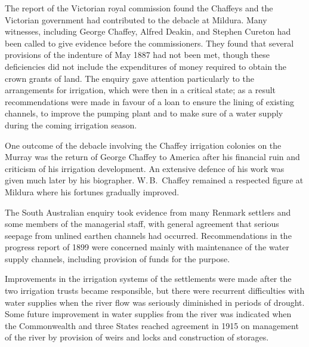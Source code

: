 The report of the Victorian royal commission  found the Chaffeys and the Victorian
government had contributed to the debacle at Mildura.  Many witnesses,
including George Chaffey, Alfred Deakin, and Stephen Cureton had been
called to give evidence before the commissioners.  They found that
several provisions of the indenture of May 1887 had not been met,
though these deficiencies did not include the expenditures of money
required to obtain the crown grants of land.  The enquiry gave
attention particularly to the arrangements for irrigation, which were
then in a critical state; as a result recommendations were made in
favour of a loan to ensure the lining of existing
channels, to improve the pumping
plant and to make sure of a water supply during the coming irrigation
season.

One outcome of the debacle involving the Chaffey irrigation colonies
on the Murray was the return of George Chaffey  to
America after his financial ruin and
criticism of his irrigation development.  An extensive defence of his
work was given much later by his biographer. W.\,B.~Chaffey
  remained a respected figure at Mildura where
his fortunes gradually improved.

The South Australian  enquiry took evidence from many Renmark settlers
and some members of the managerial staff, with general agreement that
serious seepage from unlined earthen
channels had occurred.
Recommendations in the progress report of 1899 were concerned main\-ly
with maintenance of the water supply channels, including provision of
funds for the purpose.

Improvements in the irrigation systems of the settlements were made
after the two irrigation trusts became responsible, but there were
recurrent difficulties with water supplies when the river flow was
seriously diminished in periods of drought.  Some
future improvement in water supplies from the river was indicated when
the Commonwealth and three States reached agreement in 1915 on
management of the river by provision of weirs
and locks and construction of storages.

